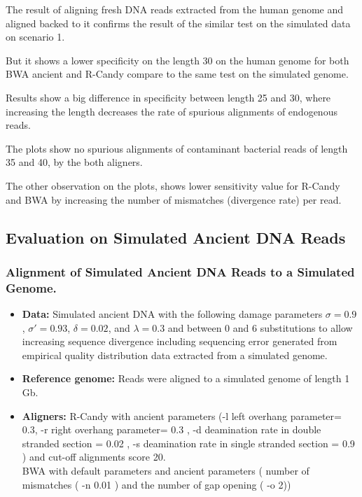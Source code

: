 \documentclass[11pt,a4paper]{report}
\begin{document}
The result of aligning fresh DNA reads extracted from the human genome and 
aligned backed to it confirms the result of the similar test on the 
simulated data on scenario 1.

But it shows a lower specificity on the length 30 on the human genome for 
both BWA ancient and R-Candy compare to the same test on the simulated genome.

Results show a big difference in specificity between length 25 and 30, where 
increasing the length decreases the rate of spurious alignments of endogenous reads.

The plots show no spurious alignments of  contaminant bacterial reads of 
length 35 and 40, by the both aligners.

The other observation on the plots, shows lower sensitivity value for R-Candy 
and BWA by increasing the number of  mismatches (divergence rate) per read.



\subsection{Evaluation on Simulated Ancient DNA Reads}

\subsubsection{Alignment of Simulated Ancient DNA Reads to a Simulated Genome.}
\label{ Alignment of Simulated Ancient DNA Reads to a Simulated Genome.}

\begin{itemize}
 
   
    \item \textbf{Data:} Simulated ancient DNA 
     with the following damage parameters $ \sigma = 0.9$, 
    $ \sigma\prime = 0.93 $, $\delta = 0.02 $,  and $\lambda = 0.3 $ and 
    between 0 and 6 substitutions to allow increasing sequence divergence
    including sequencing error generated from empirical quality distribution data
    extracted from a simulated genome.
  
 

  \item \textbf{Reference genome:}  Reads were aligned to a simulated genome of 
length 1 Gb.


  \item \textbf{Aligners:} R-Candy with ancient parameters 
  (-l left overhang parameter= 0.3, -r right overhang parameter= 0.3 , 
-d deamination rate in double stranded section = 0.02 , 
-s deamination rate in single stranded section = 0.9 )
  and cut-off alignments score 20. \\
  BWA with default parameters and ancient parameters \cite{green2010draft}
   ( number of mismatches ( -n 0.01 ) and the number of gap opening ( -o 2))

  \end{itemize}
\end{document}
